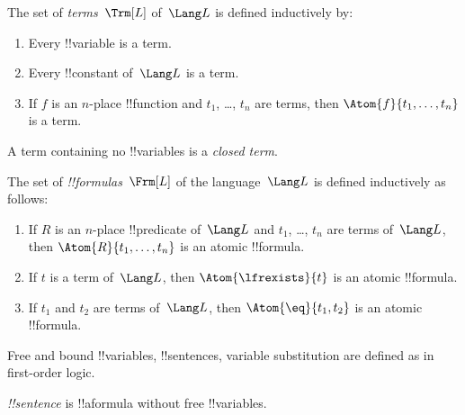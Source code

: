 \documentclass[../../../../include/open-logic-section]{subfiles}
\begin{document}
\begin{defn}[Terms]
The set of \emph{terms}~$\Trm[L]$ of~$\Lang L$ is
defined inductively by:
\begin{enumerate}
\item Every !!{variable} is a term.
\item Every !!{constant} of~$\Lang L$ is a term.
\item If $f$ is an $n$-place !!{function} and $t_1$, \dots, $t_n$
  are terms, then $\Atom{f}{t_1, \ldots, t_n}$ is a term.
\end{enumerate}
A term containing no !!{variable}s is a \emph{closed term}.
\end{defn}

\begin{defn}[Formulas]
The set of \emph{!!{formula}s}~$\Frm[L]$ of the language~$\Lang L$
is defined inductively as follows:
\begin{enumerate}


\item If $R$ is an $n$-place !!{predicate} of~$\Lang L$ and $t_1$, \dots,
  $t_n$ are terms of~$\Lang L$, then $\Atom{R}{t_1,\ldots, t_n}$ is an
  atomic !!{formula}.

\item If $t$ is a term of~$\Lang L$, then $\Atom{\lfrexists}{t}$
  is an atomic !!{formula}.

\item If $t_1$ and $t_2$ are terms of~$\Lang L$, then $\Atom{\eq}{t_1, t_2}$
  is an atomic !!{formula}.










\end{enumerate}
\end{defn}

Free and bound !!{variable}s, !!{sentence}s, variable substitution are defined as in
first-order logic.

 \emph{!!{sentence}} is !!a{formula} without free
!!{variable}s.
\end{document}
